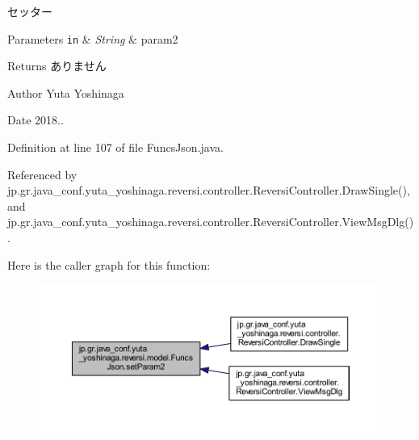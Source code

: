 セッター 


\begin{DoxyParams}[1]{Parameters}
\mbox{\tt in}  & {\em String} & param2 \\
\hline
\end{DoxyParams}
\begin{DoxyReturn}{Returns}
ありません 
\end{DoxyReturn}
\begin{DoxyAuthor}{Author}
Yuta Yoshinaga 
\end{DoxyAuthor}
\begin{DoxyDate}{Date}
2018.. 
\end{DoxyDate}


Definition at line 107 of file Funcs\+Json.\+java.



Referenced by jp.\+gr.\+java\+\_\+conf.\+yuta\+\_\+yoshinaga.\+reversi.\+controller.\+Reversi\+Controller.\+Draw\+Single(), and jp.\+gr.\+java\+\_\+conf.\+yuta\+\_\+yoshinaga.\+reversi.\+controller.\+Reversi\+Controller.\+View\+Msg\+Dlg().

Here is the caller graph for this function\+:
\nopagebreak
\begin{figure}[H]
\begin{center}
\leavevmode
\includegraphics[width=350pt]{classjp_1_1gr_1_1java__conf_1_1yuta__yoshinaga_1_1reversi_1_1model_1_1_funcs_json_aa1d17801d47f0d701f6792fa5f06e435_icgraph}
\end{center}
\end{figure}
\mbox{\label{classjp_1_1gr_1_1java__conf_1_1yuta__yoshinaga_1_1reversi_1_1model_1_1_funcs_json_a27bc732004c573269cb63e71c1d1abcc}} 
